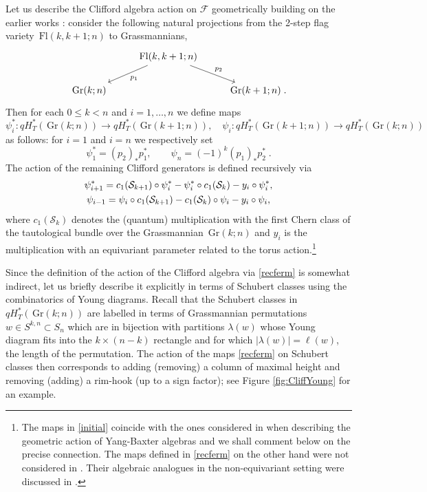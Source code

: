 \documentclass[12pt]{amsart}
\newcommand{\cS}{\mathcal{S}}
\newcommand{\Fl}{\,\mathrm{Fl}}
\newcommand{\Gr}{\,\mathrm{Gr}}
\newcommand{\mc}[1]{\mathcal{#1}}
\numberwithin{equation}{section}
\numberwithin{figure}{section}
\begin{document}
Let us describe the Clifford algebra action on $\mc{F}$ geometrically building on the earlier works \cite{GKS20,korffstroppel2010}: consider the following natural projections from the 2-step flag variety $\Fl(k,k+1;n)$ to Grassmannians,
\begin{equation}\label{pushpull}
    \begin{tikzcd}
        & \Fl(k, k +1; n) \arrow[ld, "p_1"] \arrow[rd, "p_2"] & \\
        \Gr(k; n) & & \Gr(k + 1; n)\;.
    \end{tikzcd}
\end{equation}
Then for each $0\le k<n$ and $i=1,\ldots, n$ we define maps 
$$\psi^*_i:qH^*_T(\Gr(k;n))\to qH^*_T(\Gr(k+1;n)),\quad\psi_i:qH^*_T(\Gr(k+1;n))\to qH^*_T(\Gr(k;n))$$ as follows: for $i=1$ and $i=n$ we respectively set
\begin{equation}\label{initial}
 \psi^*_1 =(p_2)_{*} p_1^*, \qquad 
 \psi_n =(-1)^{k} (p_1)_{*} p_2^*\;.
\end{equation}
The action of the remaining Clifford generators is defined recursively via
\begin{gather}\label{recferm}
     \psi^*_{i + 1} = c_1(\cS_{k + 1}) \circ \psi^*_i - \psi^*_i \circ c_1(\cS_k) - y_{i} \circ \psi^{*}_i,\\ \psi_{i - 1} = \psi_i \circ c_1(\cS_{k+1}) - c_1(\cS_{k}) \circ \psi_i - y_i \circ \psi_i,\notag
\end{gather}
where $c_1(\mc{S}_k)$ denotes the (quantum) multiplication with the first Chern class of the tautological bundle over the Grassmannian $\Gr(k;n)$ and $y_i$ is the multiplication with an equivariant parameter related to the torus action.\footnote{The maps in \eqref{initial} coincide with the ones considered in \cite{GKS20} when describing the geometric action of Yang-Baxter algebras and we shall comment below on the precise connection. The maps defined in \eqref{recferm} on the other hand were not considered in \cite{GKS20}. Their algebraic analogues in the non-equivariant setting were discussed in \cite{korffstroppel2010}.} 

Since the definition of the action of the Clifford algebra via \eqref{recferm} is somewhat indirect, let us briefly describe it explicitly in terms of Schubert classes using the combinatorics of Young diagrams. Recall that the Schubert classes in $qH^*_T(\Gr(k;n))$ are labelled in terms of Grassmannian permutations $w\in S^{k,n}\subset S_n$ which are in bijection with partitions $\lambda(w)$ whose Young diagram fits into the $k\times (n-k)$ rectangle and for which $|\lambda(w)|=\ell(w)$, the length of the permutation. The action of the maps \eqref{recferm} on Schubert classes then corresponds to adding (removing) a column of maximal height and removing (adding) a rim-hook (up to a sign factor); see Figure \ref{fig:CliffYoung} for an example. 
\end{document}
